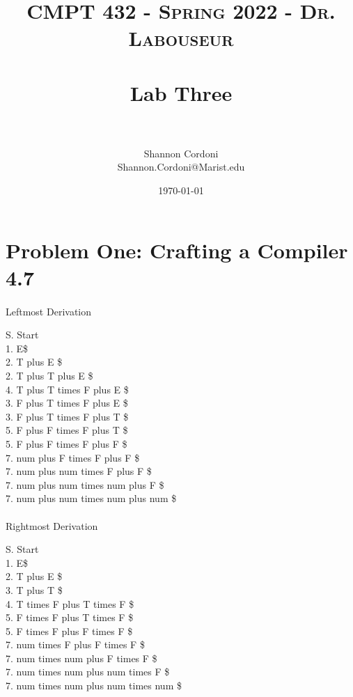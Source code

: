 \documentclass[letterpaper, 10pt,DIV=13]{scrartcl}
\title{	
   \normalfont \normalsize 
   \textsc{CMPT 432 - Spring 2022 - Dr. Labouseur} \\[10pt] %
   \horrule{0.5pt} \\[0.25cm] 	%
   \huge Lab Three  \\     	    %
   \horrule{0.5pt} \\[0.25cm] 	%
}
\author{Shannon Cordoni \\ \normalsize Shannon.Cordoni@Marist.edu}
\date{\normalsize\today} 	%
\numberwithin{equation}{section} %
\numberwithin{figure}{section} %
\numberwithin{table}{section} %
\begin{document}
\maketitle %

\section{Problem One: Crafting a Compiler 4.7}

\paragraph{} Leftmost Derivation

    S. Start \\
    1. E\$ \\
    2. T plus E \$ \\
    2. T plus T plus E \$ \\
    4. T plus T times F plus E \$ \\
    3. F plus T times F plus E \$ \\
    3. F plus T times F plus T \$ \\
    5. F plus F times F plus T \$ \\
    5. F plus F times F plus F \$ \\
    7. num plus F times F plus F \$ \\
    7. num plus num times F plus F \$ \\
    7. num plus num times num plus F \$ \\
    7. num plus num times num plus num \$ 

\paragraph{} Rightmost Derivation

    S. Start \\
    1. E\$ \\
    2. T plus E \$ \\ 
    3. T plus T \$ \\ 
    4. T times F plus T times F \$ \\ 
    5. F times F plus T times F \$ \\ 
    5. F times F plus F times F \$ \\ 
    7. num times F plus F times F \$ \\ 
    7. num times num plus F times F \$ \\ 
    7. num times num plus num times F \$ \\ 
    7. num times num plus num times num \$ \\ 
\end{document}
